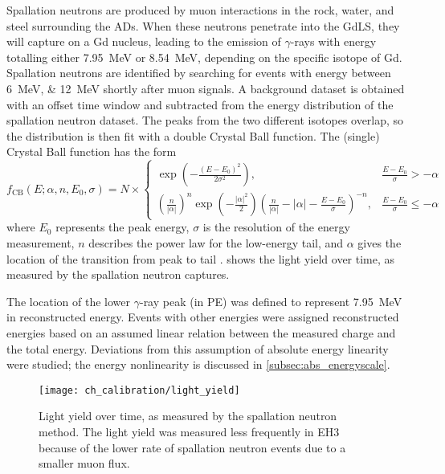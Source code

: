 Spallation neutrons are produced by muon interactions in the rock,
water, and steel surrounding the ADs.
When these neutrons penetrate into the GdLS,
they will capture on a Gd nucleus, leading to the emission of $\gamma$-rays
with energy totalling either \SI{7.95}{\MeV} or \SI{8.54}{\MeV},
depending on the specific isotope of Gd.
Spallation neutrons are identified by searching for events
with energy between \SIlist{6;12}{\MeV} shortly after muon signals.
A background dataset is obtained with an offset time window
and subtracted from the energy distribution of the spallation neutron dataset.
The peaks from the two different isotopes overlap,
so the distribution is then fit with a double Crystal Ball function.
The (single) Crystal Ball function has the form
\begin{equation}\label{eq:crystal_ball}
    f_\text{CB}(E;\alpha, n, E_0, \sigma) = N \times \begin{cases}
        \exp\left(-\frac{(E-E_0)^2}{2\sigma^2}\right),
            & \frac{E-E_0}{\sigma} > -\alpha \\
        \left(\frac{n}{|\alpha|}\right)^n \exp\left(-\frac{|\alpha|^2}{2}\right)
        \left(\frac{n}{|\alpha|} - |\alpha| - \frac{E-E_0}{\sigma}\right)^{-n},
            & \frac{E-E_0}{\sigma} \leq -\alpha
    \end{cases}
\end{equation}
where $E_0$ represents the peak energy,
$\sigma$ is the resolution of the energy measurement,
$n$ describes the power law for the low-energy tail,
and $\alpha$ gives the location of the transition from peak to tail \cite{cbfunction}.
 shows the light yield over time,
as measured by the spallation neutron captures.

The location of the lower $\gamma$-ray peak (in PE)
was defined to represent \SI{7.95}{\MeV} in reconstructed energy.
Events with other energies were assigned reconstructed energies
based on an assumed linear relation between the measured charge
and the total energy.
Deviations from this assumption of absolute energy linearity were studied;
the energy nonlinearity is discussed in \cref{subsec:abs_energyscale}.

\begin{figure}
    \centering
    \texttt{[image: ch\_calibration/light\_yield]}
    \caption[Light yield over time]{
        Light yield over time, as measured by the spallation neutron method.
        The light yield was measured less frequently in EH3
        because of the lower rate of spallation neutron events
        due to a smaller muon flux.
    }
    \label{fig:lightyield}
\end{figure}

